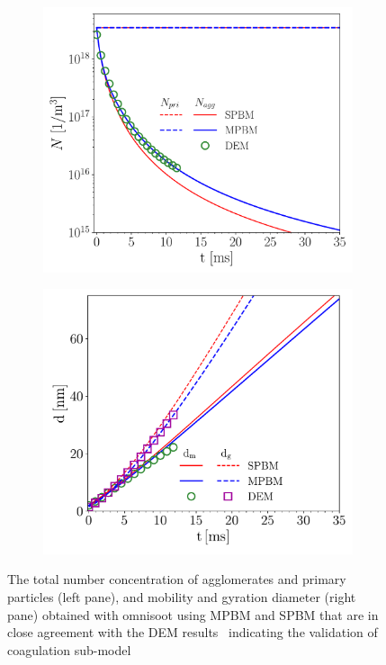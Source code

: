 \begin{figure}[H]
	\centering
	\begin{subfigure}[t]{0.4\textwidth}
		\centering
		\includegraphics[width=1\textwidth]{Figures/Results/Validation/Coagulation/N_agg_pri.pdf}
	\end{subfigure}
	\begin{subfigure}[t]{0.4\textwidth}
		\centering
		\includegraphics[width=1\textwidth]{Figures/Results/Validation/Coagulation/d_mg.pdf}
	\end{subfigure}
	\caption{The total number concentration of agglomerates and primary particles (left pane), and mobility and gyration diameter (right pane) obtained with omnisoot using MPBM and SPBM that are in close agreement with the DEM results~\citep{kholghy2021surface} indicating the validation of coagulation sub-model}
	\label{fig:coagvalid_Nd}
\end{figure}


